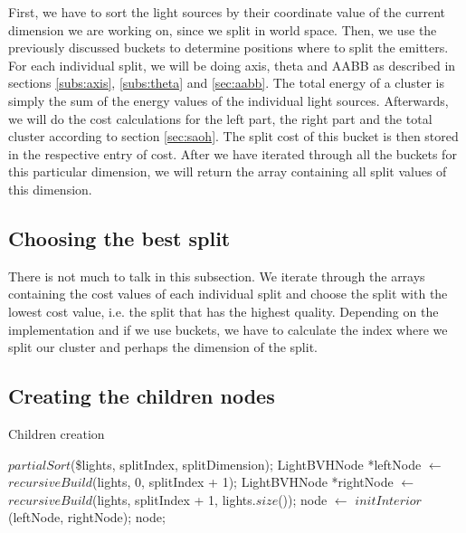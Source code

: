 First, we have to sort the light sources by their coordinate value of the current dimension we are working on, since we split in world space. Then, we use the previously discussed buckets to determine positions where to split the emitters. For each individual split, we will be doing axis, theta and AABB as described in sections \ref{subs:axis}, \ref{subs:theta} and \ref{sec:aabb}. The total energy of a cluster is simply the sum of the energy values of the individual light sources. Afterwards, we will do the cost calculations for the left part, the right part and the total cluster according to section \ref{sec:saoh}. The split cost of this bucket is then stored in the respective entry of cost. After we have iterated through all the buckets for this particular dimension, we will return the array containing all split values of this dimension.

\subsection{Choosing the best split}

There is not much to talk in this subsection. We iterate through the arrays containing the cost values of each individual split and choose the split with the lowest cost value, i.e. the split that has the highest quality. Depending on the implementation and if we use buckets, we have to calculate the index where we split our cluster and perhaps the dimension of the split.

\subsection{Creating the children nodes}

\begin{algorithm}
	\caption{Children creation}
	\label{alg:childrencreation}
	\begin{algorithmic}[1] %
		\State $partialSort$(\$lights, splitIndex, splitDimension);
		\State LightBVHNode *leftNode $\gets$ $recursiveBuild$(lights, 0, splitIndex + 1);
		\State LightBVHNode *rightNode $\gets$ $recursiveBuild$(lights, splitIndex + 1, lights.$size$());
		\State node $\gets$ $initInterior$(leftNode, rightNode);
		\State \Return node;
		\EndProcedure
	\end{algorithmic}
\end{algorithm}

